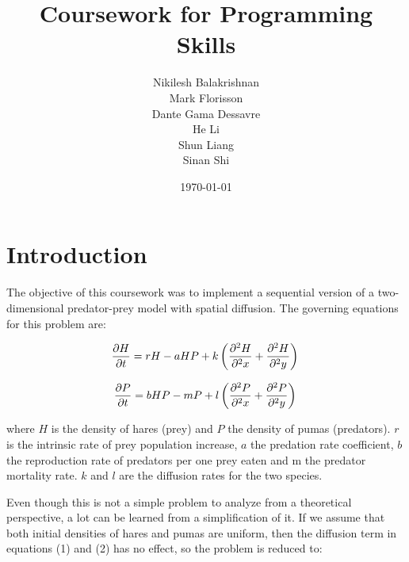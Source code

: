 \documentclass[12pt,a4paper]{article}
\begin{document}
\title{Coursework for Programming Skills}
\author{Nikilesh Balakrishnan\\
        Mark Florisson\\
        Dante Gama Dessavre\\
        He Li\\
        Shun Liang\\
        Sinan Shi}
\date{\today}

\makeEPCCtitle

\thispagestyle{empty}

\newpage


\tableofcontents

\newpage


\section{Introduction}

The objective of this coursework was to implement a sequential version of a two-dimensional predator-prey model with spatial diffusion. The governing equations for this problem are:

\begin{equation}
\frac{\partial H}{\partial t}=rH-aHP+k\left(\frac{\partial^2 H}{\partial^2 x}+\frac{\partial^2 H}{\partial^2 y}\right)\\
\end{equation}

\begin{equation}
\frac{\partial P}{\partial t}=bHP-mP+l\left(\frac{\partial^2 P}{\partial^2 x}+\frac{\partial^2 P}{\partial^2 y}\right)\\
\end{equation}

where $H$ is the density of hares (prey) and $P$ the density of pumas (predators). $r$ is the intrinsic rate of prey population increase, $a$ the predation rate coefficient, $b$ the reproduction rate of predators per one prey eaten and m the predator mortality rate. $k$ and $l$ are the diffusion rates for the two species.

Even though this is not a simple problem to analyze from a theoretical perspective, a lot can be learned from a simplification of it. If we assume that both initial densities of hares and pumas are uniform, then the diffusion term in equations (1) and (2) has no effect, so the problem is reduced to:
\end{document}

